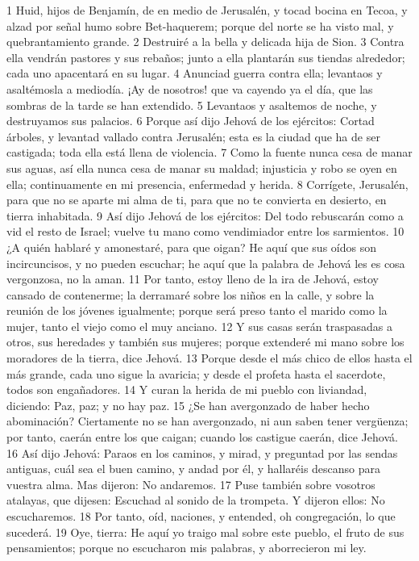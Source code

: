 1 Huid, hijos de Benjamín, de en medio de Jerusalén, y tocad bocina en Tecoa, y alzad por señal humo sobre Bet-haquerem; porque del norte se ha visto mal, y quebrantamiento grande.
2 Destruiré a la bella y delicada hija de Sion.
3 Contra ella vendrán pastores y sus rebaños; junto a ella plantarán sus tiendas alrededor; cada uno apacentará en su lugar.
4 Anunciad guerra contra ella; levantaos y asaltémosla a mediodía. ¡Ay de nosotros! que va cayendo ya el día, que las sombras de la tarde se han extendido.
5 Levantaos y asaltemos de noche, y destruyamos sus palacios.
6 Porque así dijo Jehová de los ejércitos: Cortad árboles, y levantad vallado contra Jerusalén; esta es la ciudad que ha de ser castigada; toda ella está llena de violencia.
7 Como la fuente nunca cesa de manar sus aguas, así ella nunca cesa de manar su maldad; injusticia y robo se oyen en ella; continuamente en mi presencia, enfermedad y herida.
8 Corrígete, Jerusalén, para que no se aparte mi alma de ti, para que no te convierta en desierto, en tierra inhabitada.
9 Así dijo Jehová de los ejércitos: Del todo rebuscarán como a vid el resto de Israel; vuelve tu mano como vendimiador entre los sarmientos.
10 ¿A quién hablaré y amonestaré, para que oigan? He aquí que sus oídos son incircuncisos, y no pueden escuchar; he aquí que la palabra de Jehová les es cosa vergonzosa, no la aman.
11 Por tanto, estoy lleno de la ira de Jehová, estoy cansado de contenerme; la derramaré sobre los niños en la calle, y sobre la reunión de los jóvenes igualmente; porque será preso tanto el marido como la mujer, tanto el viejo como el muy anciano.
12 Y sus casas serán traspasadas a otros, sus heredades y también sus mujeres; porque extenderé mi mano sobre los moradores de la tierra, dice Jehová.
13 Porque desde el más chico de ellos hasta el más grande, cada uno sigue la avaricia; y desde el profeta hasta el sacerdote, todos son engañadores.
14 Y curan la herida de mi pueblo con liviandad, diciendo: Paz, paz; y no hay paz. 
15 ¿Se han avergonzado de haber hecho abominación? Ciertamente no se han avergonzado, ni aun saben tener vergüenza; por tanto, caerán entre los que caigan; cuando los castigue caerán, dice Jehová. 
16 Así dijo Jehová: Paraos en los caminos, y mirad, y preguntad por las sendas antiguas, cuál sea el buen camino, y andad por él, y hallaréis descanso para vuestra alma. Mas dijeron: No andaremos.
17 Puse también sobre vosotros atalayas, que dijesen: Escuchad al sonido de la trompeta. Y dijeron ellos: No escucharemos.
18 Por tanto, oíd, naciones, y entended, oh congregación, lo que sucederá.
19 Oye, tierra: He aquí yo traigo mal sobre este pueblo, el fruto de sus pensamientos; porque no escucharon mis palabras, y aborrecieron mi ley.
